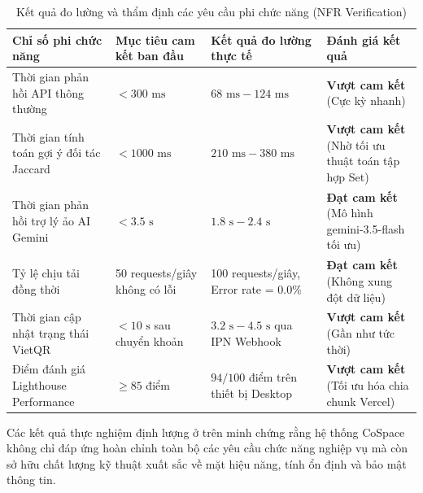 \begin{table}[H]
\centering
\caption{Kết quả đo lường và thẩm định các yêu cầu phi chức năng (NFR Verification)}
\label{tab:nfr-verification}
\renewcommand{\arraystretch}{1.3}
\begin{tabular}{|p{3.2cm}|p{3.8cm}|p{4cm}|p{3.5cm}|}
\hline
\textbf{Chỉ số phi chức năng} & \textbf{Mục tiêu cam kết ban đầu} & \textbf{Kết quả đo lường thực tế} & \textbf{Đánh giá kết quả} \\
\hline
Thời gian phản hồi API thông thường & $< 300\text{ ms}$ & $68\text{ ms} - 124\text{ ms}$ & \textbf{Vượt cam kết} (Cực kỳ nhanh) \\
\hline
Thời gian tính toán gợi ý đối tác Jaccard & $< 1000\text{ ms}$ & $210\text{ ms} - 380\text{ ms}$ & \textbf{Vượt cam kết} (Nhờ tối ưu thuật toán tập hợp Set) \\
\hline
Thời gian phản hồi trợ lý ảo AI Gemini & $< 3.5\text{ s}$ & $1.8\text{ s} - 2.4\text{ s}$ & \textbf{Đạt cam kết} (Mô hình gemini-3.5-flash tối ưu) \\
\hline
Tỷ lệ chịu tải đồng thời & 50 requests/giây không có lỗi & 100 requests/giây, Error rate = 0.0\% & \textbf{Đạt cam kết} (Không xung đột dữ liệu) \\
\hline
Thời gian cập nhật trạng thái VietQR & $< 10\text{ s}$ sau chuyển khoản & $3.2\text{ s} - 4.5\text{ s}$ qua IPN Webhook & \textbf{Vượt cam kết} (Gần như tức thời) \\
\hline
Điểm đánh giá Lighthouse Performance & $\ge 85$ điểm & $94/100$ điểm trên thiết bị Desktop & \textbf{Vượt cam kết} (Tối ưu hóa chia chunk Vercel) \\
\hline
\end{tabular}
\end{table}

Các kết quả thực nghiệm định lượng ở trên minh chứng rằng hệ thống CoSpace không chỉ đáp ứng hoàn chỉnh toàn bộ các yêu cầu chức năng nghiệp vụ mà còn sở hữu chất lượng kỹ thuật xuất sắc về mặt hiệu năng, tính ổn định và bảo mật thông tin.